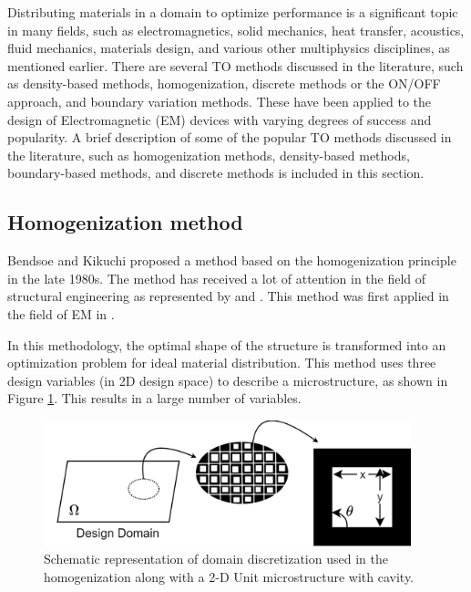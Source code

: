 Distributing materials in a domain to optimize performance is a significant topic in many fields, such as electromagnetics, solid mechanics, heat transfer, acoustics, fluid mechanics, materials design, and various other multiphysics disciplines, as mentioned earlier. There are several TO methods discussed in the literature, such as density-based methods, homogenization, discrete methods or the ON/OFF approach, and boundary variation methods. These have been applied to the design of Electromagnetic (EM) devices with varying degrees of success and popularity. A brief description of some of the popular TO methods discussed in the literature, such as homogenization methods, density-based methods, boundary-based methods, and discrete methods is included in this section.

\subsection{Homogenization method}

Bendsoe and Kikuchi \parencite{bendsoe1988generating} proposed a method based on the homogenization principle in the late 1980s. The method has received a lot of attention in the field of structural engineering as represented by \cite{bendsoe1993topology} and  \cite{allaire1997homogenization}. This method was first applied in the field of EM in \parencite{yoo2000structural}.

In this methodology, the optimal shape of the structure is transformed into an optimization problem for ideal material distribution. This method uses three design variables (in 2D design space) to describe a microstructure, as shown in Figure \ref{fig:MDP_homo_microStructure}. This results in a large number of variables. 

\begin{figure}[h!]
    \centering
    \includegraphics[width=0.95\textwidth]{Figures/Ch_MDP/homo_microStructure.png}
    \caption{Schematic representation of domain discretization used in the homogenization along with a 2-D Unit microstructure with cavity.}
    \label{fig:MDP_homo_microStructure}
\end{figure}

